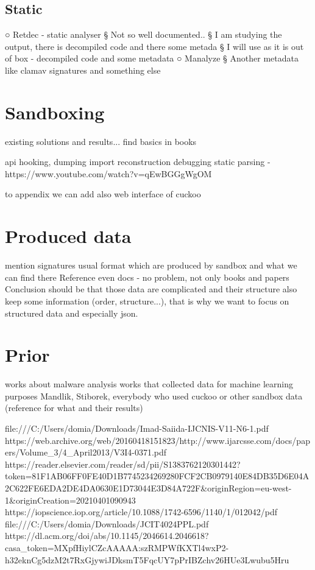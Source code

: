 \subsection{Static}
○ Retdec - static analyser
§ Not so well documented..
§ I am studying the output, there is decompiled code and there some metada
§ I will use as it is out of box - decompiled code and some metadata
○ Manalyze
§ Another metadata like clamav signatures and something else


\section{Sandboxing}
existing solutions and results...
find basics in books

api hooking, dumping import reconstruction debugging static parsing - https://www.youtube.com/watch?v=qEwBGGgWgOM

to appendix we can add also web interface of cuckoo


\section{Produced data}
mention signatures
usual format which are produced by sandbox and what we can find there
Reference even docs - no problem, not only books and papers
Conclusion should be that those data are complicated and their structure also keep some information (order, structure...), that is why we want to focus on structured data and especially json.


\section{Prior}
works about malware analysis
works that collected data for machine learning purposes
Mandlik, Stiborek, everybody who used cuckoo or other sandbox data (reference for what and their results)

file:///C:/Users/domia/Downloads/Imad-Saiida-IJCNIS-V11-N6-1.pdf
https://web.archive.org/web/20160418151823/http://www.ijarcsse.com/docs/papers/Volume_3/4_April2013/V3I4-0371.pdf
https://reader.elsevier.com/reader/sd/pii/S1383762120301442?token=81F1AB06FF0FE40D1B7745234269280FCF2CB0979140E84DB35D6E04A2C622FE6EDA2DE4DA0630E1D73044E3D84A722F&originRegion=eu-west-1&originCreation=20210401090943
https://iopscience.iop.org/article/10.1088/1742-6596/1140/1/012042/pdf
file:///C:/Users/domia/Downloads/JCIT4024PPL.pdf
https://dl.acm.org/doi/abs/10.1145/2046614.2046618?casa_token=MXpfHiylCZcAAAAA:szRMPWfKXTl4wxP2-h32eknCg5dzM2t7RxGjywiJDksmT5FqcUY7pPrIBZchv26HUe3Lwubu5Hru

